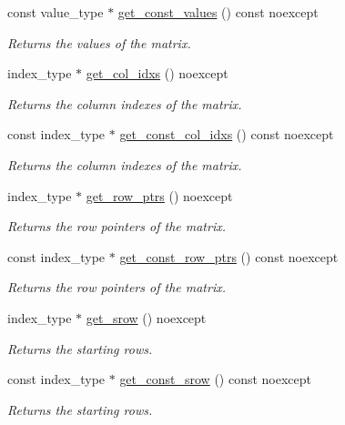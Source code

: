 \begin{DoxyCompactItemize}
const value\+\_\+type $\ast$ \hyperlink{classgko_1_1matrix_1_1Csr_a1801347665214bbefc837b44ba0695ff}{get\+\_\+const\+\_\+values} () const noexcept
\begin{DoxyCompactList}\small\item\em Returns the values of the matrix. \end{DoxyCompactList}\item 
index\+\_\+type $\ast$ \hyperlink{classgko_1_1matrix_1_1Csr_a81c6294177a1be4873804c8a85a9fc64}{get\+\_\+col\+\_\+idxs} () noexcept
\begin{DoxyCompactList}\small\item\em Returns the column indexes of the matrix. \end{DoxyCompactList}\item 
const index\+\_\+type $\ast$ \hyperlink{classgko_1_1matrix_1_1Csr_ac9d640d26449e0ee46c7cb2b80100d65}{get\+\_\+const\+\_\+col\+\_\+idxs} () const noexcept
\begin{DoxyCompactList}\small\item\em Returns the column indexes of the matrix. \end{DoxyCompactList}\item 
index\+\_\+type $\ast$ \hyperlink{classgko_1_1matrix_1_1Csr_a068e5158cf282fa977f0a137f8cd7f03}{get\+\_\+row\+\_\+ptrs} () noexcept
\begin{DoxyCompactList}\small\item\em Returns the row pointers of the matrix. \end{DoxyCompactList}\item 
const index\+\_\+type $\ast$ \hyperlink{classgko_1_1matrix_1_1Csr_a50c9ce521649450d7ae5ff488e42c190}{get\+\_\+const\+\_\+row\+\_\+ptrs} () const noexcept
\begin{DoxyCompactList}\small\item\em Returns the row pointers of the matrix. \end{DoxyCompactList}\item 
index\+\_\+type $\ast$ \hyperlink{classgko_1_1matrix_1_1Csr_a919fb1efdcbde6fba7eb18bdc39ba46a}{get\+\_\+srow} () noexcept
\begin{DoxyCompactList}\small\item\em Returns the starting rows. \end{DoxyCompactList}\item 
const index\+\_\+type $\ast$ \hyperlink{classgko_1_1matrix_1_1Csr_ac046f27c47848bf31c9234567661ef48}{get\+\_\+const\+\_\+srow} () const noexcept
\begin{DoxyCompactList}\small\item\em Returns the starting rows. \end{DoxyCompactList}\item 

\end{DoxyCompactItemize}
